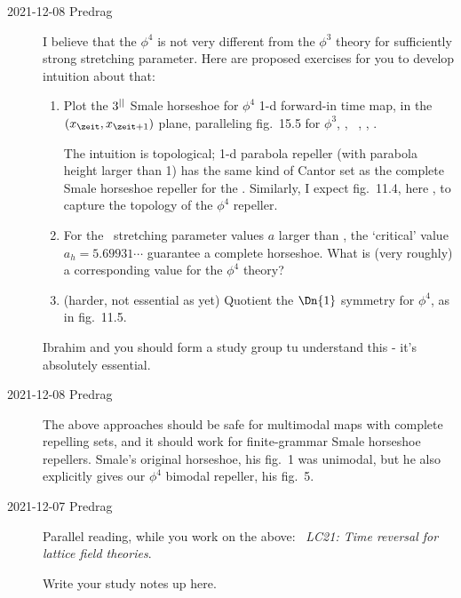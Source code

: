 \begin{description}

\item[2021-12-08 Predrag]
I believe that the $\phi^4$ is not very different from the $\phi^3$
theory for sufficiently strong stretching parameter. Here are proposed
exercises for you to develop intuition about that:
\begin{enumerate}
  \item
Plot the $3^{||}$ Smale horseshoe for $\phi^4$ 1-d forward-in time map,
in the $(\ssp_{\zeit},\ssp_{\zeit+1})$ plane, paralleling
 {fig.~15.5} for $\phi^3$, \ie,
\HenonMap\ , ,
.

The intuition is topological; 1-d parabola repeller (with parabola height
larger than 1) has the same kind of Cantor set as the complete Smale
horseshoe repeller for the {\HenonMap}. Similarly, I expect
 {fig.~11.4}, here , to
capture the topology of the $\phi^4$ repeller.

  \item
For the \HenonMap\ stretching parameter values $a$ larger than
, the `critical' value $a_h=5.69931\cdots$ guarantee
a complete horseshoe. What is (very roughly) a corresponding value for the
$\phi^4$ theory?
  \item (harder, not essential as yet)
Quotient the $\Dn{1}$ symmetry for $\phi^4$, as in
 {fig.~11.5}.
\end{enumerate}
Ibrahim and you should form a study group tu understand this -
it's absolutely essential.


\item[2021-12-08 Predrag]
The above approaches should be safe for multimodal maps with complete
repelling sets,
and it should work for finite-grammar Smale horseshoe repellers.
Smale's
original horseshoe, his fig.~1 was unimodal, but he also
explicitly gives our $\phi^4$ bimodal repeller, his fig.~5.

\item[2021-12-07 Predrag]
Parallel reading, while you work on the above:
~{\em LC21: Time reversal for lattice field theories}.

Write your study notes up here.


\end{description}
